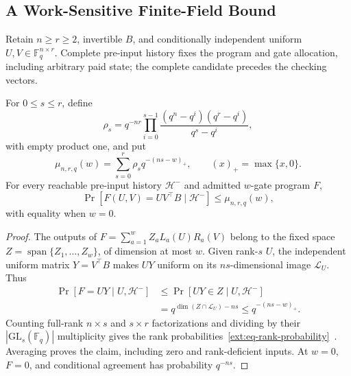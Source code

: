 
\subsection{A Work-Sensitive Finite-Field Bound}
\label{ext:sec-profile}

Retain $n\ge r\ge2$, invertible $B$, and conditionally independent uniform
$U,V\in\mathbb F_q^{n\times r}$. Complete pre-input history fixes the
program and gate allocation, including arbitrary paid state; the complete
candidate precedes the checking vectors.

\begin{lemma}
\label{ext:lem-output-span}
For $0\le s\le r$, define
\begin{equation}
\rho_s=q^{-nr}\prod_{i=0}^{s-1}
       \frac{(q^n-q^i)(q^r-q^i)}{q^s-q^i},
\label{ext:eq-rank-probability}
\end{equation}
with empty product one, and put
\begin{equation}
\mu_{n,r,q}(w)=\sum_{s=0}^{r}\rho_s q^{-(ns-w)_+},
\qquad (x)_+=\max\{x,0\}.
\label{ext:eq-mu}
\end{equation}
For every reachable pre-input history $\mathcal H^-$ and admitted $w$-gate program $F$,
\begin{equation}
\Pr[F(U,V)=UV^\top B\mid\mathcal H^-]\le\mu_{n,r,q}(w),
\label{ext:eq-span-agreement}
\end{equation}
with equality when $w=0$.
\end{lemma}

\begin{proof}
The outputs of $F=\sum_{a=1}^{w}Z_aL_a(U)R_a(V)$ belong to the fixed space
$Z=\operatorname{span}\{Z_1,\ldots,Z_w\}$, of dimension at most $w$.
Given rank-$s$ $U$, the independent uniform matrix $Y=V^\top B$ makes $UY$
uniform on its $ns$-dimensional image $\mathcal L_U$. Thus
\begin{equation}
\begin{aligned}
\Pr[F=UY\mid U,\mathcal H^-]
&\le\Pr[UY\in Z\mid U,\mathcal H^-]\\
&=q^{\dim(Z\cap\mathcal L_U)-ns}
 \le q^{-(ns-w)_+}.
\end{aligned}
\label{ext:eq-span-intersection}
\end{equation}
Counting full-rank $n\times s$ and $s\times r$ factorizations and dividing
by their $|\mathrm{GL}_s(\mathbb F_q)|$ multiplicity gives the rank
probabilities~\eqref{ext:eq-rank-probability}~\cite{LaksovThorup1994}.
Averaging proves the claim, including zero and rank-deficient inputs.
At $w=0$, $F=0$, and conditional agreement has probability $q^{-ns}$.
\end{proof}

